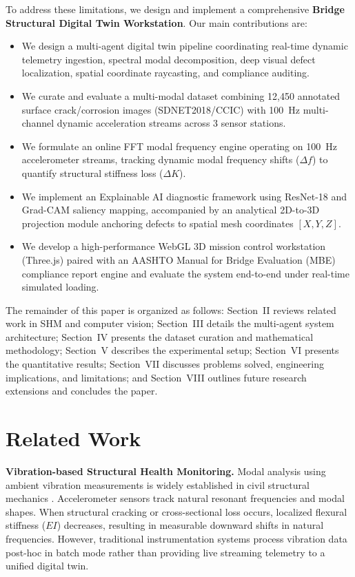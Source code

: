 \documentclass[10pt, conference, letterpaper]{IEEEtran}
\begin{document}
To address these limitations, we design and implement a comprehensive \textbf{Bridge Structural Digital Twin Workstation}. Our main contributions are:
\begin{itemize}
    \item We design a multi-agent digital twin pipeline coordinating real-time dynamic telemetry ingestion, spectral modal decomposition, deep visual defect localization, spatial coordinate raycasting, and compliance auditing.
    \item We curate and evaluate a multi-modal dataset combining 12,450 annotated surface crack/corrosion images (SDNET2018/CCIC) with 100~Hz multi-channel dynamic acceleration streams across 3 sensor stations.
    \item We formulate an online FFT modal frequency engine operating on 100~Hz accelerometer streams, tracking dynamic modal frequency shifts ($\Delta f$) to quantify structural stiffness loss ($\Delta K$).
    \item We implement an Explainable AI diagnostic framework using ResNet-18 and Grad-CAM saliency mapping, accompanied by an analytical 2D-to-3D projection module anchoring defects to spatial mesh coordinates $[X,Y,Z]$.
    \item We develop a high-performance WebGL 3D mission control workstation (Three.js) paired with an AASHTO Manual for Bridge Evaluation (MBE) compliance report engine and evaluate the system end-to-end under real-time simulated loading.
\end{itemize}

The remainder of this paper is organized as follows: Section~II reviews related work in SHM and computer vision; Section~III details the multi-agent system architecture; Section~IV presents the dataset curation and mathematical methodology; Section~V describes the experimental setup; Section~VI presents the quantitative results; Section~VII discusses problems solved, engineering implications, and limitations; and Section~VIII outlines future research extensions and concludes the paper.

\section{Related Work}

\textbf{Vibration-based Structural Health Monitoring.} Modal analysis using ambient vibration measurements is widely established in civil structural mechanics \cite{farrar2007}. Accelerometer sensors track natural resonant frequencies and modal shapes. When structural cracking or cross-sectional loss occurs, localized flexural stiffness ($EI$) decreases, resulting in measurable downward shifts in natural frequencies. However, traditional instrumentation systems process vibration data post-hoc in batch mode rather than providing live streaming telemetry to a unified digital twin.
\end{document}
